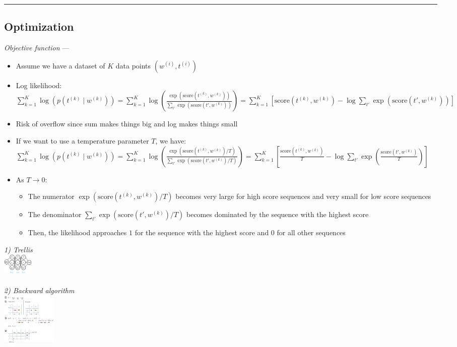 {\color{black}\hrule height 0.001mm}

\subsection*{Optimization}
\emph{Objective function} --- 
\begin{itemize}
    \item Assume we have a dataset of $K$ data points $( w^{(i)}, t^{(i)} )$
    \item Log likelihood:
    $
    \sum_{k=1}^K \log(p(t^{(k)} \mid w^{(k)})) = \sum_{k=1}^K \log ( \frac{\exp(\textrm{score}(t^{(k)}, w^{(k)}))}{\sum_{t'} \exp(\textrm{score}(t', w^{(k)}))} ) = \sum_{k=1}^K [ \textrm{score}(t^{(k)}, w^{(k)}) - \log \sum_{t'} \exp(\textrm{score}(t', w^{(k)})) ]
    $
    \item Risk of overflow since sum makes things big and log makes things small
    \item If we want to use a temperature parameter $T$, we have:
    $
    \sum_{k=1}^K \log(p(t^{(k)} \mid w^{(k)})) = \sum_{k=1}^K \log ( \frac{\exp(\textrm{score}(t^{(k)}, w^{(k)})/ T)}{\sum_{t'} \exp(\textrm{score}(t', w^{(k)})/ T)} ) = \sum_{k=1}^K [ \frac{\textrm{score}(t^{(k)}, w^{(k)})}{T} - \log \sum_{t'} \exp(\frac{\textrm{score}(t', w^{(k)})}{T}) ]
    $
    \item As $T \to 0$:
    \begin{itemize}
        \item The numerator $\exp(\textrm{score}(t^{(k)}, w^{(k)})/ T)$ becomes very large for high score sequences and very small for low score sequences
        \item The denominator $\sum_{t'} \exp(\textrm{score}(t', w^{(k)})/ T)$ becomes dominated by the sequence with the highest score
        \item Then, the likelihood approaches $1$ for the sequence with the highest score and $0$ for all other sequences
    \end{itemize}
\end{itemize}

\begin{multicols}{2}
\textit{1) Trellis}\\
\includegraphics[height=10mm]{inhalt/images/NLP/06_pos_1.png}
\\\\
\textit{2) Backward algorithm}\\
\includegraphics[height=25mm]{inhalt/images/NLP/06_pos_2.png}
\end{multicols}